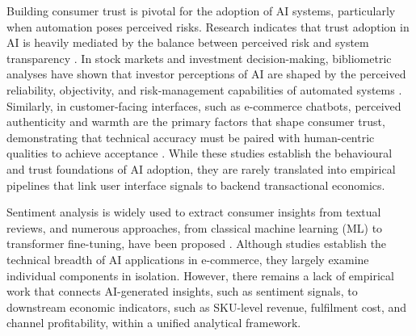 \documentclass[authoryear,review,3p,times,12pt]{elsarticle}
\begin{document}
Building consumer trust is pivotal for the adoption of AI systems, particularly when automation poses perceived risks. Research indicates that trust adoption in AI is heavily mediated by the balance between perceived risk and system transparency \citep{phan2025ai_trust}. In stock markets and investment decision-making, bibliometric analyses have shown that investor perceptions of AI are shaped by the perceived reliability, objectivity, and risk-management capabilities of automated systems \citep{phan2026mind}. Similarly, in customer-facing interfaces, such as e-commerce chatbots, perceived authenticity and warmth are the primary factors that shape consumer trust, demonstrating that technical accuracy must be paired with human-centric qualities to achieve acceptance \citep{phan2025ai_heart}. While these studies establish the behavioural and trust foundations of AI adoption, they are rarely translated into empirical pipelines that link user interface signals to backend transactional economics.

Sentiment analysis is widely used to extract consumer insights from textual reviews, and numerous approaches, from classical machine learning (ML) to transformer fine-tuning, have been proposed \citep{liu2020sentiment, bellar12152403, DAZA2024100267}. Although studies \citep{bawack2022artificial, liu2020sentiment, bellar12152403, DAZA2024100267} establish the technical breadth of AI applications in e-commerce, they largely examine individual components in isolation. However, there remains a lack of empirical work that connects AI-generated insights, such as sentiment signals, to downstream economic indicators, such as SKU-level revenue, fulfilment cost, and channel profitability, within a unified analytical framework.
\end{document}
